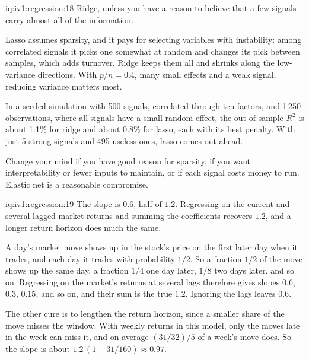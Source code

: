 \begin{solution}{iq:iv1:regression:18}
Ridge, unless you have a reason to believe that a few signals carry almost all of the information.

Lasso assumes sparsity, and it pays for selecting variables with instability: among correlated signals it picks one somewhat at random and changes its pick between samples, which adds turnover. Ridge keeps them all and shrinks along the low-variance directions. With $p/n = 0.4$, many small effects and a weak signal, reducing variance matters most.

In a seeded simulation with 500 signals, correlated through ten factors, and 1\,250 observations, where all signals have a small random effect, the out-of-sample $R^2$ is about 1.1\% for ridge and about 0.8\% for lasso, each with its best penalty. With just 5 strong signals and 495 useless ones, lasso comes out ahead.

Change your mind if you have good reason for sparsity, if you want interpretability or fewer inputs to maintain, or if each signal costs money to run. Elastic net is a reasonable compromise.

\end{solution}

\begin{solution}{iq:iv1:regression:19}
The slope is $0.6$, half of $1.2$. Regressing on the current and several lagged market returns and summing the coefficients recovers $1.2$, and a longer return horizon does much the same.

A day's market move shows up in the stock's price on the first later day when it trades, and each day it trades with probability $1/2$. So a fraction $1/2$ of the move shows up the same day, a fraction $1/4$ one day later, $1/8$ two days later, and so on. Regressing on the market's returns at several lags therefore gives slopes $0.6$, $0.3$, $0.15$, and so on, and their sum is the true $1.2$. Ignoring the lags leaves $0.6$.

The other cure is to lengthen the return horizon, since a smaller share of the move misses the window. With weekly returns in this model, only the moves late in the week can miss it, and on average $(31/32)/5$ of a week's move does. So the slope is about $1.2\,(1 - 31/160) \approx 0.97$.

\end{solution}

